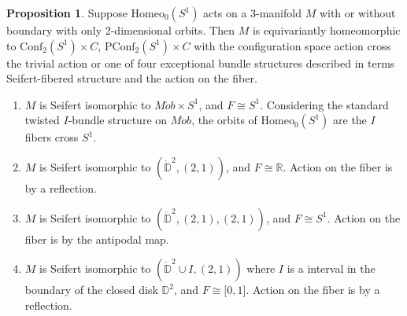 \documentclass[10pt, oneside]{article}
\newcommand{\R}{\mathbb{R}}
\newcommand{\Z}{\mathbb{Z}}
\newcommand{\homeo}[1][S^1]{\text{Homeo}_0(#1)}
\newcommand{\conf}[2][S^1]{\text{Conf}_{#2}(#1)}
\newcommand{\pconf}[2][S^1]{\text{PConf}_{#2}(#1)}
\theoremstyle{definition}
\newtheorem{prop}{Proposition}[section]
\theoremstyle{definition}
\begin{document}
\begin{prop}\label{prop:orbit-bundle-computation}
    Suppose $\homeo$ acts on a 3-manifold $M$ with or without boundary with only 2-dimensional orbits. Then $M$ is equivariantly homeomorphic to $\conf{2}\times C$, $\pconf{2}\times C$ with the configuration space action cross the trivial action or one of four exceptional bundle structures described in terms Seifert-fibered structure and the action on the fiber.
    \begin{enumerate}
        \item $M$ is Seifert isomorphic to $M\ddot{o}b\times S^1$, and $F\cong S^1$. Considering the standard twisted $I$-bundle structure on $M\ddot{o}b$, the orbits of $\homeo$ are the $I$ fibers cross $S^1$.
        \item $M$ is Seifert isomorphic to $(\mathring{\mathbb{D}}^2, (2, 1))$, and $F\cong \R$. Action on the fiber is by a reflection.
        \item $M$ is Seifert isomorphic to $(\mathring{\mathbb{D}}^2, (2, 1), (2,1))$, and $F\cong S^1$. Action on the fiber is by the antipodal map.
        \item $M$ is Seifert isomorphic to $(\mathring{\mathbb{D}}^2\cup I, (2,1))$ where $I$ is a interval in the boundary of the closed disk $\mathbb{D}^2$, and $F \cong \lbrack 0,1\rbrack$. Action on the fiber is by a reflection.
    \end{enumerate}

\end{prop}
\end{document}
